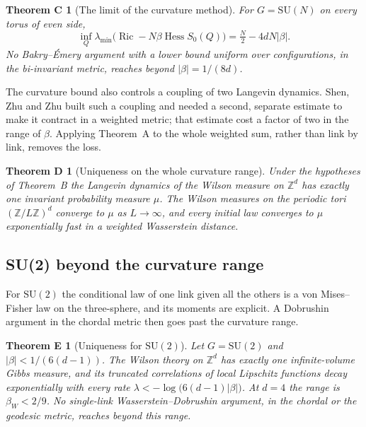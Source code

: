 \documentclass[aps,prd,twocolumn,superscriptaddress,nofootinbib,longbibliography,floatfix,amsmath,amssymb,10pt]{revtex4-2}
\newtheorem*{theoremC}{Theorem C}
\newtheorem*{theoremD}{Theorem D}
\newtheorem*{theoremE}{Theorem E}
\theoremstyle{definition}
\theoremstyle{remark}
\newcommand{\Z}{\mathbb{Z}}
\newcommand{\SU}{\mathrm{SU}}
\newcommand{\Hess}{\operatorname{Hess}}
\newcommand{\Ric}{\operatorname{Ric}}
\begin{document}
\begin{theoremC}[The limit of the curvature method]
For $G=\SU(N)$ on every torus of even side,
\[
\inf_Q\lambda_{\min}\bigl(\Ric-N\beta\Hess S_0(Q)\bigr)=\tfrac N2-4dN|\beta|.
\]
No Bakry--\'Emery argument with a lower bound uniform over configurations,
in the bi-invariant metric, reaches beyond $|\beta|=1/(8d)$.
\end{theoremC}

The curvature bound also controls a coupling of two Langevin dynamics. Shen,
Zhu and Zhu built such a coupling and needed a second, separate estimate to
make it contract in a weighted metric; that estimate cost a factor of two in
the range of $\beta$. Applying Theorem~A to the whole weighted sum, rather
than link by link, removes the loss.

\begin{theoremD}[Uniqueness on the whole curvature range]
Under the hypotheses of Theorem~B the Langevin dynamics of the Wilson
measure on $\Z^d$ has exactly one invariant probability measure $\mu$. The
Wilson measures on the periodic tori $(\Z/L\Z)^d$ converge to $\mu$ as
$L\to\infty$, and every initial law converges to $\mu$ exponentially fast in a
weighted Wasserstein distance.
\end{theoremD}

\subsection{SU(2) beyond the curvature range}

For $\SU(2)$ the conditional law of one link given all the others is a von
Mises--Fisher law on the three-sphere, and its moments are explicit. A
Dobrushin argument in the chordal metric then goes past the curvature range.

\begin{theoremE}[Uniqueness for $\SU(2)$]
Let $G=\SU(2)$ and $|\beta|<1/(6(d-1))$. The Wilson theory on $\Z^d$ has
exactly one infinite-volume Gibbs measure, and its truncated correlations of
local Lipschitz functions decay exponentially with every rate
$\lambda<-\log\bigl(6(d-1)|\beta|\bigr)$. At $d=4$ the range is
$\beta_W<2/9$. No single-link Wasserstein--Dobrushin argument, in the
chordal or the geodesic metric, reaches beyond this range.
\end{theoremE}
\end{document}
